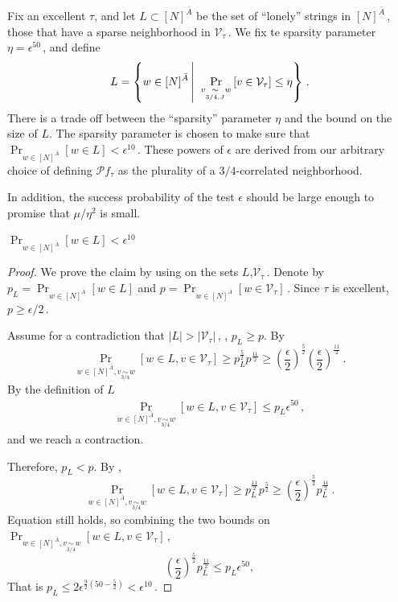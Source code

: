 \documentclass{toc}
\newcommand{\Prob}[2][]{\Pr_{{#1}}\left[#2\right]} %
\newcommand{\Paren}[1]{\left(#1\right)} %
\newcommand{\abs}[1]{\lvert#1\rvert} %
\newcommand\sett[2]{\left\{ #1 \left| \; \vphantom{#1 #2} \right. #2  \right\}} %
\newcommand\f{f} %
\newcommand\bh{\mathcal{P}\f_\tau} %
\newcommand\cons{\mathcal{V}} %
\newcommand\cor[1]{\underset{\scriptscriptstyle#1}{\sim}} %
\newcommand\rest[1]{{\bar{#1}}}  %
\begin{document}
Fix an excellent $\tau$, and let $L\subset [N]^{\rest{A}}$ be the set of ``lonely'' strings in $[N]^{\rest{A}}$\,, those that have a sparse neighborhood in $\cons_\tau$\,. We fix te sparsity parameter $\eta = \epsilon^{50}$\,, and define
\[ L = \sett{w\in [N]^{\rest{A}}}{\Prob[v\cor{3/4,J}w]{v\in \cons_\tau}\leq \eta}\,. \] %
There is a trade off between the ``sparsity'' parameter $\eta$ and the bound on the size of $L$. The sparsity parameter is chosen to make sure that $\Pr_{w\in[N]^{\rest{A}}}[w\in L] <  \epsilon^{10}$\,. These powers of $\epsilon$ are derived from our arbitrary choice of defining $\bh$ as the plurality of a 
%
%
%
$3/4$-correlated  %
neighborhood.

In addition, the success probability of the test $\epsilon$ should be large enough to promise that 
%
$\mu/\eta^2$ %
 is small.

\begin{claim}\label{claim:few lonely}
    $\Pr_{w\in[N]^{\rest{A}}}[w\in L]< \epsilon^{10}$
\end{claim}
\begin{proof}
    We prove the claim by using  on the sets $L$,$\cons_\tau$\,. Denote by $p_L = \Pr_{w\in[N]^{\rest{A}}}[w\in L]$ and $p = \Pr_{w\in[N]^{\rest{A}}}[w\in \cons_\tau]$\,.
    Since $\tau$ is excellent, $p\geq
    \epsilon/2$\,. %
    
Assume %
for   %
a contradiction that $\abs{L}>\abs{\cons_\tau}$\,, \ie, $p_L \geq p$. By 
    \[ \Pr_{w\in[N]^{\rest{A}},v\cor{3/4}w}[w\in L,v\in\cons_\tau]\geq p_L^{\frac{5}{2}}p^{\frac{11}{2}} \geq \Paren{\frac{\epsilon}{2}}^{\frac{5}{2}}\Paren{\frac{\epsilon}{2}}^{\frac{11}{2}}\,. \]%
    By the definition of $L$
    \begin{align}\label{eq:L bound}
        \Pr_{w\in[N]^{\rest{A}},v\cor{3/4}w}[w\in L,v\in\cons_\tau] \leq p_L \epsilon^{50}\,, %
    \end{align} 
    and we reach a contraction. 
    
    Therefore, $p_L < p$. By , 
    \[ \Pr_{w\in[N]^{\rest{A}},v\cor{3/4}w}[w\in L,v\in\cons_\tau]\geq p_L^{\frac{11}{2}}p^{\frac{5}{2}} \geq \Paren{\frac{\epsilon}{2}}^{\frac{5}{2}}p_L^{\frac{11}{2}}\,. \] %
    Equation  still holds, so combining the two bounds on $ \Pr_{w\in[N]^{\rest{A}},v\cor{3/4}w}[w\in L,v\in\cons_\tau]$\,,
    \[ \Paren{\frac{\epsilon}{2}}^{\frac{5}{2}}p_L^{\frac{11}{2}} \leq p_L \epsilon^{50}, \]
    That is $p_L\leq 2\epsilon^{\frac{9}{2}(50-\frac{5}{2})}<\epsilon^{10}$\,.
\end{proof}
\end{document}
